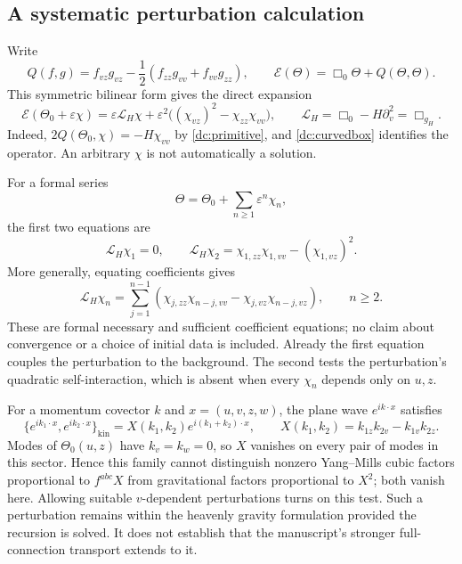 \documentclass[11pt]{article}
\numberwithin{equation}{section}
\theoremstyle{remark}
\begin{document}
\subsection{A systematic perturbation calculation}

Write
\begin{equation}
 Q(f,g)=f_{vz}g_{vz}
 -\frac12(f_{zz}g_{vv}+f_{vv}g_{zz}),
 \qquad \mathcal E(\Theta)=\Box_0\Theta+Q(\Theta,\Theta).
\end{equation}
This symmetric bilinear form gives the direct expansion
\begin{equation}\label{dc:one-perturbation}
 \mathcal E(\Theta_0+\varepsilon\chi)
 =\varepsilon\mathcal L_H\chi
 +\varepsilon^2\big((\chi_{vz})^2-\chi_{zz}\chi_{vv}\big),
 \qquad
 \mathcal L_H=\Box_0-H\partial_v^2=\Box_{g_H}.
\end{equation}
Indeed, $2Q(\Theta_0,\chi)=-H\chi_{vv}$ by
\eqref{dc:primitive}, and \eqref{dc:curvedbox} identifies the operator.
An arbitrary $\chi$ is not automatically a solution.

For a formal series
\begin{equation}
 \Theta=\Theta_0+\sum_{n\ge1}\varepsilon^n\chi_n,
\end{equation}
the first two equations are
\begin{equation}\label{dc:second-order}
 \mathcal L_H\chi_1=0,
 \qquad
 \mathcal L_H\chi_2=
 \chi_{1,zz}\chi_{1,vv}-(\chi_{1,vz})^2.
\end{equation}
More generally, equating coefficients gives
\begin{equation}\label{dc:all-orders}
 \mathcal L_H\chi_n
 =\sum_{j=1}^{n-1}
 \left(\chi_{j,zz}\chi_{n-j,vv}
       -\chi_{j,vz}\chi_{n-j,vz}\right),
 \qquad n\ge2.
\end{equation}
These are formal necessary and sufficient coefficient equations; no
claim about convergence or a choice of initial data is included.
Already the first equation couples the perturbation to the background.
The second tests the perturbation's quadratic self-interaction, which
is absent when every $\chi_n$ depends only on $u,z$.

For a momentum covector $k$ and $x=(u,v,z,w)$, the plane wave
$e^{ik\cdot x}$ satisfies
\begin{equation}
 \{e^{ik_1\cdot x},e^{ik_2\cdot x}\}_{\mathrm{kin}}
 =X(k_1,k_2)e^{i(k_1+k_2)\cdot x},
 \qquad
 X(k_1,k_2)=k_{1z}k_{2v}-k_{1v}k_{2z}.
\end{equation}
Modes of $\Theta_0(u,z)$ have $k_v=k_w=0$, so $X$ vanishes on every
pair of modes in this sector. Hence this family cannot distinguish
nonzero Yang--Mills cubic factors proportional to $f^{abc}X$ from
gravitational factors proportional to $X^2$; both vanish here.
Allowing suitable $v$-dependent perturbations turns on this test.
Such a perturbation remains within the heavenly gravity formulation
provided the recursion is solved. It does not establish that the
manuscript's stronger full-connection transport extends to it.
\end{document}
